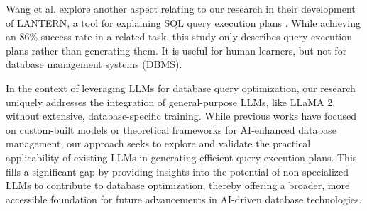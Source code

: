 Wang et al. explore another aspect relating to our research in their development of LANTERN, a tool for explaining SQL query execution plans \cite{wang2021}. While achieving an 86\% success rate in a related task, this study only describes query execution plans rather than generating them. It is useful for human learners, but not for database management systems (DBMS).

In the context of leveraging LLMs for database query optimization, our research uniquely addresses the integration of general-purpose LLMs, like LLaMA 2, without extensive, database-specific training. While previous works have focused on custom-built models or theoretical frameworks for AI-enhanced database management, our approach seeks to explore and validate the practical applicability of existing LLMs in generating efficient query execution plans. This fills a significant gap by providing insights into the potential of non-specialized LLMs to contribute to database optimization, thereby offering a broader, more accessible foundation for future advancements in AI-driven database technologies.
